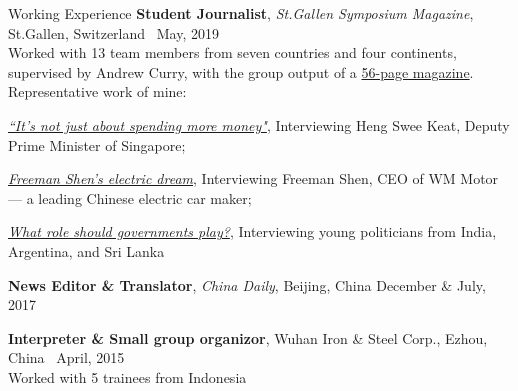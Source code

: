 \documentclass{resume}
\begin{document}
\begin{rSection}{Working Experience}
{\bf Student Journalist}{, \textit {St.Gallen Symposium Magazine}, St.Gallen, Switzerland } \hfill {\ May, 2019}\\
Worked with 13 team members from seven countries and four continents, supervised by Andrew Curry, with the group output of a \href{https://www.symposium.org/sites/default/files/2019-11/Magazine\%2049th\%20St.\%20Gallen\%20Symposium.pdf}{56-page magazine}. Representative work of mine:
\begin{cvitems}
   \item {\href{https://www.symposium.org/articles/its-not-just-about-spending-more-money}{\textit{``It's not just about spending more money"}}, Interviewing Heng Swee Keat, Deputy Prime Minister of Singapore;}
   \item {\href{https://www.symposium.org/articles/freeman-shens-electric-dream}{\textit{Freeman Shen's electric dream}}, Interviewing Freeman Shen, CEO of WM Motor --- a leading Chinese electric car maker;}
   \item {\href{https://www.symposium.org/articles/what-role-should-governments-play}{\textit{What role should governments play?}}, Interviewing young politicians from India, Argentina, and Sri Lanka}
\end{cvitems}

{\bf News Editor \& Translator}{, \textit {China Daily}, Beijing, China } \hfill {December \& July, 2017}

{\bf Interpreter \& Small group organizor}{,  Wuhan Iron \& Steel Corp., Ezhou, China } \hfill {\ April, 2015}\\
Worked with 5 trainees from Indonesia

\end{rSection}
\end{document}
